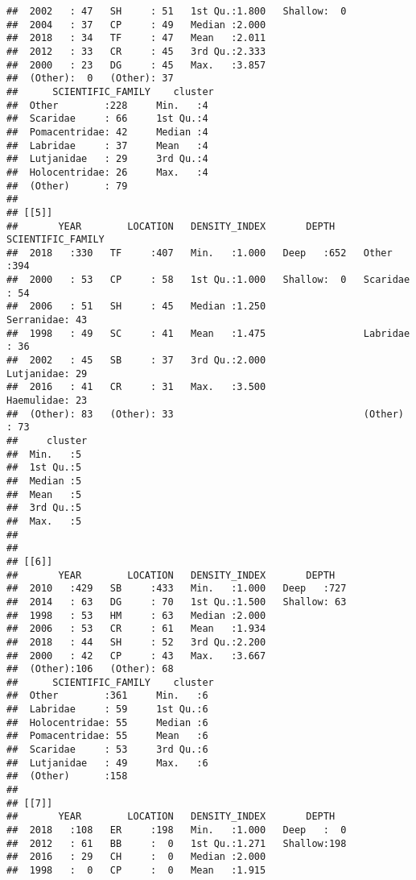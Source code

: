 \documentclass[
]{article}
\begin{document}
\begin{verbatim}
##  2002   : 47   SH     : 51   1st Qu.:1.800   Shallow:  0  
##  2004   : 37   CP     : 49   Median :2.000                
##  2018   : 34   TF     : 47   Mean   :2.011                
##  2012   : 33   CR     : 45   3rd Qu.:2.333                
##  2000   : 23   DG     : 45   Max.   :3.857                
##  (Other):  0   (Other): 37                                
##      SCIENTIFIC_FAMILY    cluster 
##  Other        :228     Min.   :4  
##  Scaridae     : 66     1st Qu.:4  
##  Pomacentridae: 42     Median :4  
##  Labridae     : 37     Mean   :4  
##  Lutjanidae   : 29     3rd Qu.:4  
##  Holocentridae: 26     Max.   :4  
##  (Other)      : 79                
## 
## [[5]]
##       YEAR        LOCATION   DENSITY_INDEX       DEPTH      SCIENTIFIC_FAMILY
##  2018   :330   TF     :407   Min.   :1.000   Deep   :652   Other     :394    
##  2000   : 53   CP     : 58   1st Qu.:1.000   Shallow:  0   Scaridae  : 54    
##  2006   : 51   SH     : 45   Median :1.250                 Serranidae: 43    
##  1998   : 49   SC     : 41   Mean   :1.475                 Labridae  : 36    
##  2002   : 45   SB     : 37   3rd Qu.:2.000                 Lutjanidae: 29    
##  2016   : 41   CR     : 31   Max.   :3.500                 Haemulidae: 23    
##  (Other): 83   (Other): 33                                 (Other)   : 73    
##     cluster 
##  Min.   :5  
##  1st Qu.:5  
##  Median :5  
##  Mean   :5  
##  3rd Qu.:5  
##  Max.   :5  
##             
## 
## [[6]]
##       YEAR        LOCATION   DENSITY_INDEX       DEPTH    
##  2010   :429   SB     :433   Min.   :1.000   Deep   :727  
##  2014   : 63   DG     : 70   1st Qu.:1.500   Shallow: 63  
##  1998   : 53   HM     : 63   Median :2.000                
##  2006   : 53   CR     : 61   Mean   :1.934                
##  2018   : 44   SH     : 52   3rd Qu.:2.200                
##  2000   : 42   CP     : 43   Max.   :3.667                
##  (Other):106   (Other): 68                                
##      SCIENTIFIC_FAMILY    cluster 
##  Other        :361     Min.   :6  
##  Labridae     : 59     1st Qu.:6  
##  Holocentridae: 55     Median :6  
##  Pomacentridae: 55     Mean   :6  
##  Scaridae     : 53     3rd Qu.:6  
##  Lutjanidae   : 49     Max.   :6  
##  (Other)      :158                
## 
## [[7]]
##       YEAR        LOCATION   DENSITY_INDEX       DEPTH    
##  2018   :108   ER     :198   Min.   :1.000   Deep   :  0  
##  2012   : 61   BB     :  0   1st Qu.:1.271   Shallow:198  
##  2016   : 29   CH     :  0   Median :2.000                
##  1998   :  0   CP     :  0   Mean   :1.915                

\end{verbatim}
\end{document}
